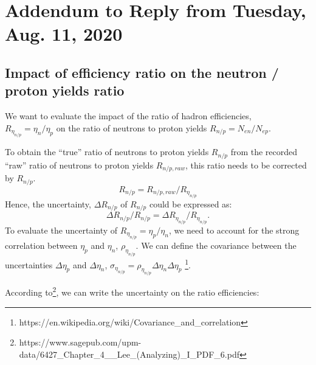 \documentclass[11pt]{article}
\begin{document}
%
\section*{Addendum to Reply from Tuesday, Aug. 11, 2020}

\subsection*{Impact of efficiency ratio on the neutron / proton yields ratio}

{\hskip 0.7cm}We want to evaluate the impact of the ratio of hadron efficiencies,\\
$R_{\eta_{n/p}} = \eta_n/\eta_p$
on the ratio of neutrons to proton yields $R_{n/p} = N_{en}/N_{ep}$.

To obtain the ``true'' ratio of neutrons to proton yields $R_{n/p}$ from the recorded ``raw''
ratio of neutrons to proton yields $R_{n/p, raw}$,
this ratio needs to be corrected by $R_{n/p}$.
%
\begin{equation}
  R_{n/p} = R_{n/p, raw}/R_{\eta_{n/p}}
\end{equation}
%
Hence, the uncertainty, $\Delta R_{n/p}$ of $R_{n/p}$ could be expressed as:
%
\begin{equation}
  \Delta R_{n/p}/R_{n/p} = \Delta R_{\eta_{n/p}}/R_{\eta_{n/p}}.
\end{equation}
%
To evaluate the uncertainty of $R_{\eta_{n/p}} = \eta_p/\eta_n$,
we need to account for the strong correlation between $\eta_p$ and $\eta_n$, $\rho_{\eta_{n/p}}$. 
We can define the covariance between the uncertainties $\Delta \eta_p$ and $\Delta \eta_n$,
$\sigma_{\eta_{n/p}} = \rho_{\eta_{n/p}} \Delta \eta_{n} \Delta \eta_{p}$ \footnote{https://en.wikipedia.org/wiki/Covariance\_and\_correlation}.

According to\footnote{https://www.sagepub.com/upm-data/6427\_Chapter\_4\_\_Lee\_(Analyzing)\_I\_PDF\_6.pdf}, we can write the uncertainty on the ratio efficiencies:
\end{document}
